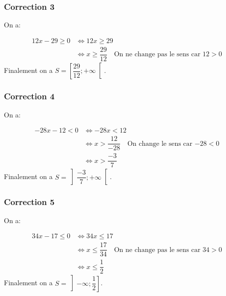 \documentclass[15pt, mathserif]{beamer}
\begin{document}
\begin{frame}
\vspace{-10mm}
	\frametitle{Correction 3}
On a:

\begin{align*}
	12x-29\geq 0 & \Leftrightarrow 12x\geq29\\
	 & \Leftrightarrow x\geq\dfrac{29}{12} \quad \text{On ne change pas le sens car $12>0$}
\end{align*}Finalement on a $S = \left[\dfrac{29}{12};+\infty\right[$.\end{frame}


\begin{frame}
\vspace{-10mm}
	\frametitle{Correction 4}
On a:

\begin{align*}
	-28x-12< 0 & \Leftrightarrow -28x<12\\
	 & \Leftrightarrow x>\dfrac{12}{-28} \quad \text{On change le sens car $-28<0$}\\
	 & \Leftrightarrow x>\dfrac{-3}{7}
\end{align*}Finalement on a $S = \left]\dfrac{-3}{7};+\infty\right[$.\end{frame}


\begin{frame}
\vspace{-10mm}
	\frametitle{Correction 5}
On a:

\begin{align*}
	34x-17\leq 0 & \Leftrightarrow 34x\leq17\\
	 & \Leftrightarrow x\leq\dfrac{17}{34} \quad \text{On ne change pas le sens car $34>0$}\\
	 & \Leftrightarrow x\leq\dfrac{1}{2}
\end{align*}Finalement on a $S = \left]-\infty;\dfrac{1}{2}\right]$.\end{frame}
\end{document}
